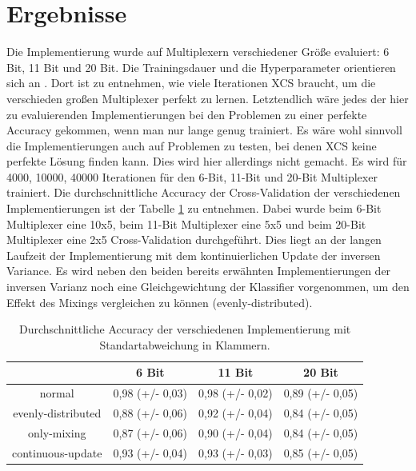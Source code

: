 \documentclass{ocsmnar}
\begin{document}
\section{Ergebnisse}
Die Implementierung wurde auf Multiplexern verschiedener Größe evaluiert: 6 Bit, 11 Bit und 20 Bit. Die Trainingsdauer und die Hyperparameter orientieren sich an \cite{iqbal13}. Dort ist zu entnehmen, wie viele Iterationen XCS braucht, um die verschieden großen Multiplexer perfekt zu lernen. Letztendlich wäre jedes der hier zu evaluierenden Implementierungen bei den Problemen zu einer perfekte Accuracy gekommen, wenn man nur lange genug trainiert. Es wäre wohl sinnvoll die Implementierungen auch auf Problemen zu testen, bei denen XCS keine perfekte Lösung finden kann. Dies wird hier allerdings nicht gemacht. 
Es wird für 4000, 10000, 40000 Iterationen für den 6-Bit, 11-Bit und 20-Bit Multiplexer trainiert. 
Die durchschnittliche Accuracy der Cross-Validation der verschiedenen Implementierungen ist der Tabelle \ref{accuracy-tabelle}
 zu entnehmen. Dabei wurde beim 6-Bit Multiplexer eine 10x5, beim 11-Bit Multiplexer eine 5x5 und beim 20-Bit Multiplexer eine 2x5 Cross-Validation durchgeführt. Dies liegt an der langen Laufzeit der Implementierung mit dem kontinuierlichen Update der inversen Variance.
Es wird neben den beiden bereits erwähnten Implementierungen der inversen Varianz noch eine Gleichgewichtung der Klassifier vorgenommen, um den Effekt des Mixings vergleichen zu können (evenly-distributed).  

\begin{table}
    
\begin{center}\label{accuracy-tabelle}
\begin{tabular}{|c|c|c|c|}
    \hline
    & 6 Bit & 11 Bit & 20 Bit \\
    \hline
    normal & 0,98 (+/- 0,03) & 0,98 (+/- 0,02) & 0,89 (+/- 0,05) \\
    \hline
    evenly-distributed & 0,88 (+/- 0,06) & 0,92 (+/- 0,04) & 0,84 (+/- 0,05) \\
    \hline
    only-mixing & 0,87 (+/- 0,06) & 0,90 (+/- 0,04) & 0,84 (+/- 0,05) \\
    \hline
    continuous-update & 0,93 (+/- 0,04) & 0,93 (+/- 0,03) & 0,85 (+/- 0,05) \\
    \hline
\end{tabular}
\end{center}
\caption{Durchschnittliche Accuracy der verschiedenen Implementierung mit Standartabweichung in Klammern. }
\end{table}
\end{document}
